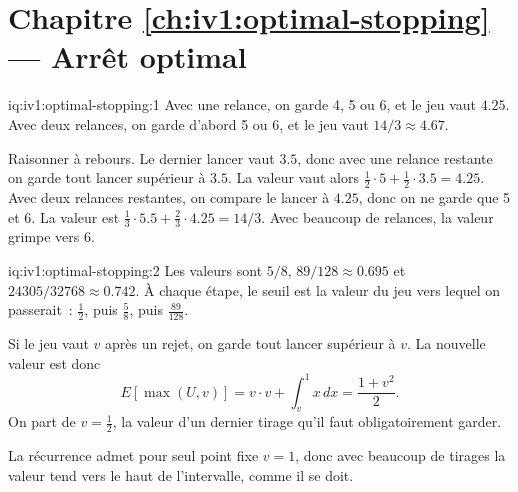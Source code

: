 \section*{Chapitre \ref{ch:iv1:optimal-stopping} --- Arrêt optimal}

\begin{solution}{iq:iv1:optimal-stopping:1}
Avec une relance, on garde 4, 5 ou 6, et le jeu vaut $4.25$. Avec deux relances, on garde d'abord 5 ou 6, et le jeu vaut $14/3 \approx 4.67$.

Raisonner à rebours. Le dernier lancer vaut $3.5$, donc avec une relance restante on garde tout lancer supérieur à $3.5$. La valeur vaut alors $\tfrac12 \cdot 5 + \tfrac12 \cdot 3.5 = 4.25$. Avec deux relances restantes, on compare le lancer à $4.25$, donc on ne garde que 5 et 6. La valeur est $\tfrac13 \cdot 5.5 + \tfrac23 \cdot 4.25 = 14/3$. Avec beaucoup de relances, la valeur grimpe vers 6.

\end{solution}

\begin{solution}{iq:iv1:optimal-stopping:2}
Les valeurs sont $5/8$, $89/128 \approx 0.695$ et $24305/32768 \approx 0.742$. À chaque étape, le seuil est la valeur du jeu vers lequel on passerait~: $\tfrac12$, puis $\tfrac58$, puis $\tfrac{89}{128}$.

Si le jeu vaut $v$ après un rejet, on garde tout lancer supérieur à $v$. La nouvelle valeur est donc
\[
E[\max(U, v)] = v \cdot v + \int_v^1 x\,dx = \frac{1 + v^2}{2}.
\]
On part de $v = \tfrac12$, la valeur d'un dernier tirage qu'il faut obligatoirement garder.

La récurrence admet pour seul point fixe $v = 1$, donc avec beaucoup de tirages la valeur tend vers le haut de l'intervalle, comme il se doit.

\end{solution}

